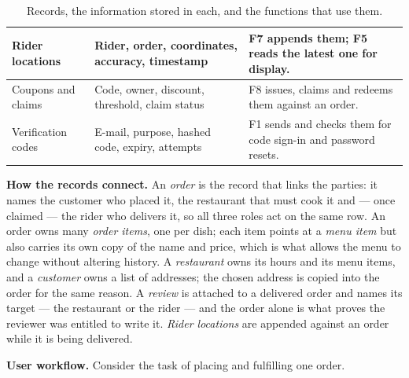 \begin{table}[h]
\begin{tabularx}{\linewidth}{|p{27mm}|Y|Y|}
Rider locations & Rider, order, coordinates, accuracy, timestamp &
F7 appends them; F5 reads the latest one for display.\\\hline
Coupons and claims & Code, owner, discount, threshold, claim status &
F8 issues, claims and redeems them against an order.\\\hline
Verification codes & E-mail, purpose, hashed code, expiry, attempts &
F1 sends and checks them for code sign-in and password resets.\\\hline
\end{tabularx}
\caption{Records, the information stored in each, and the functions that use them.}
\label{tab:data}
\end{table}

\noindent\textbf{How the records connect.} An \emph{order} is the record that links the parties:
it names the customer who placed it, the restaurant that must cook it and --- once claimed ---
the rider who delivers it, so all three roles act on the same row. An order owns many
\emph{order items}, one per dish; each item points at a \emph{menu item} but also carries its own
copy of the name and price, which is what allows the menu to change without altering history. A
\emph{restaurant} owns its hours and its menu items, and a \emph{customer} owns a list of
addresses; the chosen address is copied into the order for the same reason. A \emph{review} is
attached to a delivered order and names its target --- the restaurant or the rider --- and the
order alone is what proves the reviewer was entitled to write it. \emph{Rider locations} are
appended against an order while it is being delivered.

\noindent\textbf{User workflow.} Consider the task of placing and fulfilling one order.

